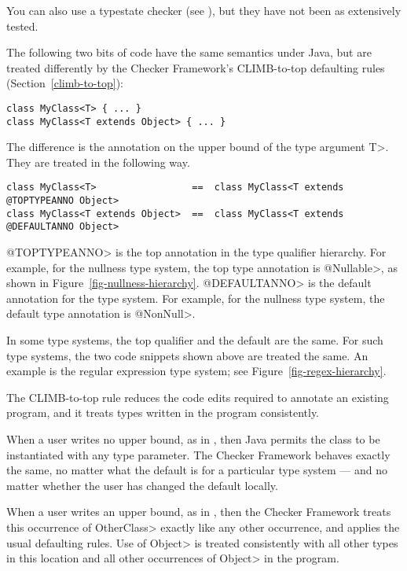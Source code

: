 You can also use a typestate checker (see
), but they have not been as extensively
tested.



The following two bits of code have the same semantics under Java, but are
treated differently by the Checker Framework's CLIMB-to-top defaulting
rules (Section~\ref{climb-to-top}):

\begin{Verbatim}
class MyClass<T> { ... }
class MyClass<T extends Object> { ... }
\end{Verbatim}

The difference is the annotation on the upper bound of the type argument
\<T>.  They are treated in the following way.

\begin{Verbatim}
class MyClass<T>                 ==  class MyClass<T extends @TOPTYPEANNO Object>
class MyClass<T extends Object>  ==  class MyClass<T extends @DEFAULTANNO Object>
\end{Verbatim}

\noindent
\<@TOPTYPEANNO> is the top annotation in the type qualifier hierarchy.  For
example, for the nullness type system, the top type annotation is
\<@Nullable>, as shown in Figure~\ref{fig-nullness-hierarchy}.
\<@DEFAULTANNO> is the default annotation for the type system.  For
example, for the nullness type system, the default type annotation is
\<@NonNull>.

In some type systems, the top qualifier and the default are the same.  For
such type systems, the two code snippets shown above are treated the same.
An example is the regular expression type system; see
Figure~\ref{fig-regex-hierarchy}.

The CLIMB-to-top rule reduces the code edits required to annotate an
existing program, and it treats types written in the program consistently.

When a user writes no upper bound, as in
,
then Java permits the class to be instantiated with any type parameter.
The Checker Framework behaves exactly the same, no matter what the default
is for a particular type system --- and no matter whether the user has
changed the default locally.

When a user writes an upper bound, as in
,
then the Checker Framework treats this occurrence of \<OtherClass> exactly
like any other occurrence, and applies the usual defaulting rules.  Use of
\<Object> is treated consistently with all other types in this location and
all other occurrences of \<Object> in the program.

